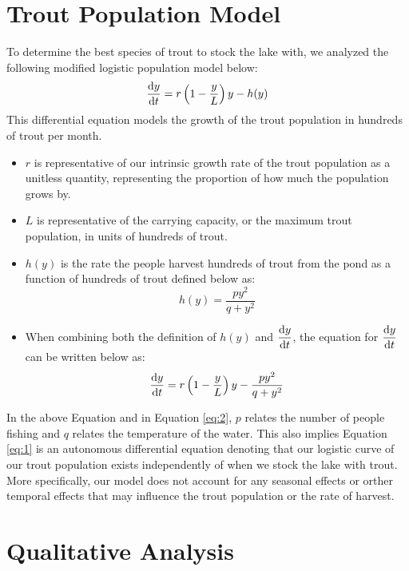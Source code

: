\documentclass[letterpaper,12pt]{article}
\begin{document}
\section{Trout Population Model}
To determine the best species of trout to stock the lake with, we analyzed the following modified logistic population model below:
\begin{equation} \label{eq:1}
    \dv{y}{t} = r\left(1 - \frac{y}{L}\right)y - h(y)
\end{equation}
This differential equation models the growth of the trout population in hundreds of trout per month. 
\begin{itemize}
    \item \(r\) is representative of our intrinsic growth rate of the trout population as a unitless quantity, representing the proportion of how much the population grows by.
    \item \(L\) is representative of the carrying capacity, or the maximum trout population, in units of hundreds of trout.
    \item \(h(y)\) is the rate the people harvest hundreds of trout from the pond as a function of hundreds of trout defined below as:
\begin{equation} \label{eq:2}
    h(y) = \frac{py^2}{q + y^2}
\end{equation}
    \item When combining both the definition of \(h(y)\) and \(\displaystyle \dv{y}{t}\), the equation for \(\displaystyle \dv{y}{t}\) can be written below as:
\begin{equation*}
    \dv{y}{t} = r\left(1 - \frac{y}{L}\right)y - \frac{py^2}{q + y^2}
\end{equation*}
\end{itemize}
In the above Equation and in Equation \eqref{eq:2}, \(p\) relates the number of people fishing and \(q\) relates the temperature of the water.
This also implies Equation \eqref{eq:1} is an autonomous differential equation denoting that our logistic curve of our trout population exists independently of when we stock the lake with trout. 
More specifically, our model does not account for any seasonal effects or orther temporal effects that may influence the trout population or the rate of harvest.
\section{Qualitative Analysis}
\end{document}
